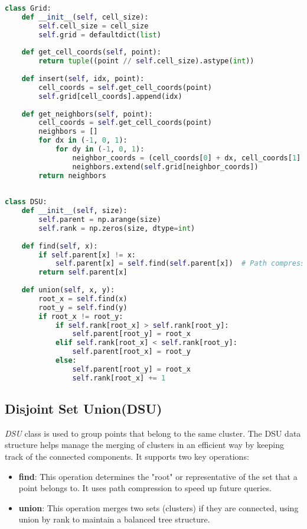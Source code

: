 \documentclass{article}
\begin{document}
	\begin{lstlisting}[language=python]
class Grid:
	def __init__(self, cell_size):
		self.cell_size = cell_size
		self.grid = defaultdict(list)
	
	def get_cell_coords(self, point):
		return tuple((point // self.cell_size).astype(int))
	
	def insert(self, idx, point):
		cell_coords = self.get_cell_coords(point)
		self.grid[cell_coords].append(idx)
	
	def get_neighbors(self, point):
		cell_coords = self.get_cell_coords(point)
		neighbors = []
		for dx in (-1, 0, 1):
			for dy in (-1, 0, 1):
				neighbor_coords = (cell_coords[0] + dx, cell_coords[1] + dy)
				neighbors.extend(self.grid[neighbor_coords])
		return neighbors
		
		
class DSU:
	def __init__(self, size):
		self.parent = np.arange(size)
		self.rank = np.zeros(size, dtype=int)
	
	def find(self, x):
		if self.parent[x] != x:
			self.parent[x] = self.find(self.parent[x])  # Path compression
		return self.parent[x]
	
	def union(self, x, y):
		root_x = self.find(x)
		root_y = self.find(y)
		if root_x != root_y:
			if self.rank[root_x] > self.rank[root_y]:
				self.parent[root_y] = root_x
			elif self.rank[root_x] < self.rank[root_y]:
				self.parent[root_x] = root_y
			else:
				self.parent[root_y] = root_x
				self.rank[root_x] += 1\end{lstlisting}
	
	\subsection*{Disjoint Set Union(DSU)}
	
	\textit{DSU} class is used to group points that belong to the same cluster. The DSU data structure helps manage the merging of clusters in an efficient way by keeping track of the connected components. It supports two key operations:
	
	\begin{itemize}
		\item[\ding{43}] \textbf{find}: This operation determines the "root" or representative of the set that a point belongs to. It uses path compression to speed up future queries.	
	
		\item[\ding{44}] \textbf{union}: This operation merges two sets (clusters) if they are connected, using union by rank to maintain a balanced tree structure.
	\end{itemize}
\end{document}
